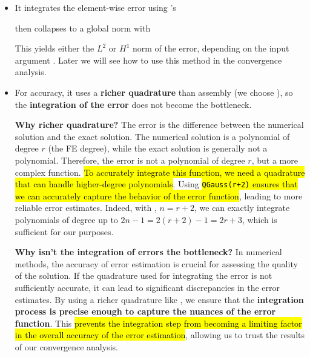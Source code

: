 \begin{itemize}
    \item It integrates the element-wise error using 's
    \begin{center}
    \end{center}
    then collapses to a global norm with
    \begin{center}
    \end{center}
    This yields either the $L^{2}$ or $H^{1}$ norm of the error, depending on the input argument . Later we will see how to use this method in the convergence analysis.
    \item For accuracy, it uses a \textbf{richer quadrature} than assembly (we choose ), so the \textbf{integration of the error} does not become the bottleneck.
    
    \textcolor{Green3}{ \textbf{Why richer quadrature?}} The error is the difference between the numerical solution and the exact solution. The numerical solution is a polynomial of degree $r$ (the FE degree), while the exact solution is generally not a polynomial. Therefore, the error is not a polynomial of degree $r$, but a more complex function. \hl{To accurately integrate this function, we need a quadrature that can handle higher-degree polynomials}. Using \hl{\texttt{QGauss(r+2)} ensures that we can accurately capture the behavior of the error function}, leading to more reliable error estimates. Indeed, with , $n = r+2$, we can exactly integrate polynomials of degree up to $2n-1 = 2(r+2)-1 = 2r + 3$, which is sufficient for our purposes.

    \textcolor{Green3}{ \textbf{Why isn't the integration of errors the bottleneck?}} In numerical methods, the accuracy of error estimation is crucial for assessing the quality of the solution. If the quadrature used for integrating the error is not sufficiently accurate, it can lead to significant discrepancies in the error estimates. By using a richer quadrature like , we ensure that the \textbf{integration process is precise enough to capture the nuances of the error function}. This \hl{prevents the integration step from becoming a limiting factor in the overall accuracy of the error estimation}, allowing us to trust the results of our convergence analysis.


\end{itemize}
